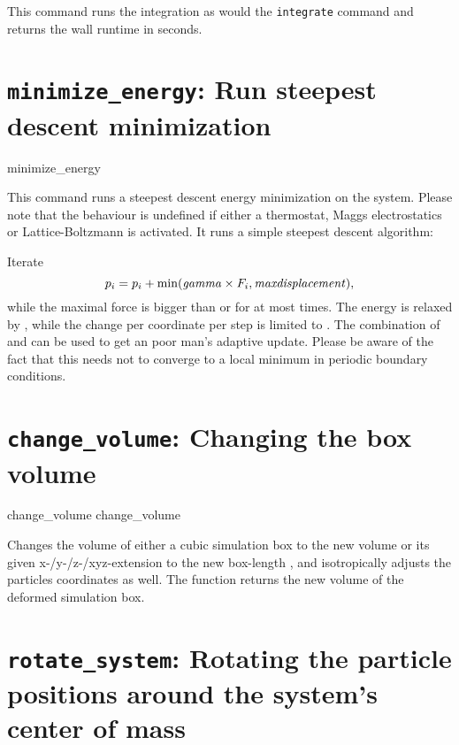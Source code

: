 This command runs the integration as would the \texttt{integrate} command and
returns the wall runtime in seconds.

\section{\texttt{minimize_energy}: Run steepest descent minimization}

\begin{essyntax}
   minimize_energy    
\end{essyntax}

This command runs a steepest descent energy minimization on the system.
Please note that the behaviour is undefined if either a thermostat, Maggs electrostatics or Lattice-Boltzmann is activated.
It runs a simple steepest descent algorithm:

Iterate
$$p_i = p_i + \min(\text{\var{gamma}} \times F_i, \text{\var{maxdisplacement}}),$$
while the maximal force is bigger than  or for at most  times.
The energy is relaxed by , while the change per coordinate per step is limited to .
The combination of  and  can be used to get an poor man's adaptive update.
Please be aware of the fact that this needs not to converge to a local minimum in periodic boundary conditions.

\section{\texttt{change_volume}: Changing the box volume}

\begin{essyntax}
   change_volume  
   change_volume  
\end{essyntax}
Changes the volume of either a cubic simulation box to the new volume
 or its given x-/y-/z-/xyz-extension to the new
box-length , and isotropically adjusts the
particles coordinates as well. The function returns the new volume of
the deformed simulation box.

\section{\texttt{rotate_system}: Rotating the particle positions around the system's center of mass}

